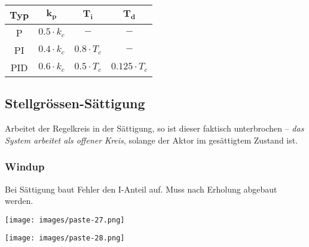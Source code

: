 \documentclass[
  10pt,
  a4paper,
  twocolumn]{article}
\numberwithin{equation}{section}
\begin{document}
\begin{center}
    \begin{tabular}{cccc}
        \hline
        \textbf{Typ} & $\mathbf{k_p}$ & $\mathbf{T_i}$ & $\mathbf{T_d}$ \\
        \hline
        P   & $0.5\cdot k_c$    & $-$             & $-$                \\
        PI  & $0.4\cdot k_c$    & $0.8\cdot T_c$  & $-$                \\
        PID & $0.6\cdot k_c$    & $0.5\cdot T_c$  & $0.125\cdot T_c$   \\
    \end{tabular}
\end{center}

\subsection{Stellgrössen-Sättigung}\label{stellgruxf6ssen-suxe4ttigung}

\begin{tcolorbox}[enhanced jigsaw, coltitle=black, colback=white, breakable, colframe=quarto-callout-warning-color-frame, rightrule=.15mm, left=2mm, opacityback=0, leftrule=.75mm, toptitle=1mm, colbacktitle=quarto-callout-warning-color!10!white, bottomtitle=1mm, arc=.35mm, bottomrule=.15mm, title=\textcolor{quarto-callout-warning-color}{\faExclamationTriangle}\hspace{0.5em}{Sättigungseffekt}, titlerule=0mm, toprule=.15mm, opacitybacktitle=0.6]

Arbeitet der Regelkreis in der Sättigung, so ist dieser faktisch
unterbrochen -- \emph{das System arbeitet als offener Kreis}, solange
der Aktor im gesättigtem Zustand ist.

\end{tcolorbox}

\subsubsection{Windup}\label{windup}

Bei Sättigung baut Fehler den I-Anteil auf. Muss nach Erholung abgebaut
werden.

\begin{center}
\texttt{[image: images/paste-27.png]}
\end{center}

\begin{center}
\texttt{[image: images/paste-28.png]}
\end{center}
\end{document}
